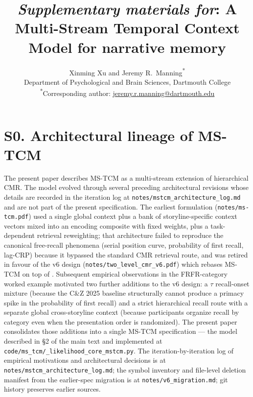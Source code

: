 \documentclass{article}
\title{\textit{Supplementary materials for}: A Multi-Stream Temporal Context Model for narrative memory}
\author{Xinming Xu and Jeremy R.\ Manning\textsuperscript{*}\\
  Department of Psychological and Brain Sciences, Dartmouth College\\
  \textsuperscript{*}Corresponding author: \href{mailto:jeremy.r.manning@dartmouth.edu}{jeremy.r.manning@dartmouth.edu}
}
\newcommand{\tauinit}{\tau}
\begin{document}
\renewcommand{\figurename}{Supplementary Figure}
\renewcommand{\tablename}{Supplementary Table}

\setcounter{equation}{0}
\setcounter{figure}{0}
\setcounter{table}{0}
\setcounter{page}{1}
\setcounter{section}{0}
\makeatletter
\renewcommand{\theequation}{S\arabic{equation}}
\renewcommand{\thefigure}{S\arabic{figure}}
\renewcommand{\thetable}{S\arabic{table}}
\renewcommand{\bibnumfmt}[1]{[S#1]}
\renewcommand{\citenumfont}[1]{S#1}

\maketitle

\section*{S0. Architectural lineage of MS-TCM}

The present paper describes MS-TCM as a multi-stream extension of
\citet{CornellZhang2025} hierarchical CMR. The model evolved through
several preceding architectural revisions whose details are recorded
in the iteration log at
\texttt{notes/mstcm\_architecture\_log.md} and are not part of the
present specification. The earliest formulation
(\texttt{notes/ms-tcm.pdf}) used a single global context plus a bank
of storyline-specific context vectors mixed into an encoding composite
with fixed weights, plus a task-dependent retrieval reweighting; that
architecture failed to reproduce the canonical free-recall phenomena
(serial position curve, probability of first recall, lag-CRP) because
it bypassed the standard CMR retrieval route, and was retired in
favour of the v6 design (\texttt{notes/two\_level\_cmr\_v6.pdf})
which rebases MS-TCM on top of \citet{CornellZhang2025}. Subsequent
empirical observations in the FRFR-category worked example motivated
two further additions to the v6 design: a $\tauinit$ recall-onset
mixture (because the C\&Z 2025 baseline structurally cannot produce a
primacy spike in the probability of first recall) and a strict
hierarchical recall route with a separate global cross-storyline
context (because participants organize recall by category even when
the presentation order is randomized). The present paper consolidates
those additions into a single MS-TCM specification --- the model
described in \S2 of the main text and implemented at
\texttt{code/ms\_tcm/\_likelihood\_core\_mstcm.py}. The
iteration-by-iteration log of empirical motivations and architectural
decisions is at \texttt{notes/mstcm\_architecture\_log.md}; the symbol inventory and
file-level deletion manifest from the earlier-spec migration is at
\texttt{notes/v6\_migration.md}; git history preserves earlier
sources.
\end{document}
